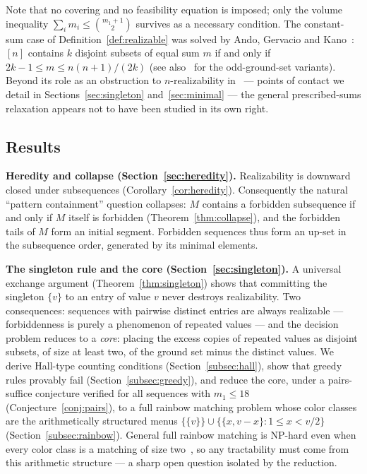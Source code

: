 \documentclass[11pt]{article}
\theoremstyle{definition}
\theoremstyle{remark}
\newcommand{\intv}[1]{[#1]}
\begin{document}
Note that no covering and no feasibility equation is imposed; only the volume
inequality $\sum_i m_i\le\binom{m_1+1}{2}$ survives as a necessary condition. The
constant-sum case of Definition~\ref{def:realizable} was solved by Ando, Gervacio and
Kano~\cite{AndoGervacioKano90}: $\intv{n}$ contains $k$ disjoint subsets of equal sum
$m$ if and only if $2k-1\le m\le n(n+1)/(2k)$ (see also~\cite{FuHu94,EnomotoKano95}
for the odd-ground-set variants). Beyond its role as an obstruction to
$n$-realizability in~\cite{LladoMoragas09,Moragas10,LladoMoragas12} --- points of
contact we detail in Sections~\ref{sec:singleton} and~\ref{sec:minimal} --- the
general prescribed-sums relaxation appears not to have been studied in its own
right.

\subsection{Results}

\textbf{Heredity and collapse (Section~\ref{sec:heredity}).}
Realizability is downward closed under subsequences
(Corollary~\ref{cor:heredity}). Consequently the natural ``pattern containment''
question collapses: $M$ contains a forbidden subsequence if and only if $M$ itself is
forbidden (Theorem~\ref{thm:collapse}), and the forbidden tails of $M$ form an initial
segment. Forbidden sequences thus form an up-set in the subsequence order, generated
by its minimal elements.

\textbf{The singleton rule and the core (Section~\ref{sec:singleton}).}
A universal exchange argument (Theorem~\ref{thm:singleton}) shows that committing the
singleton $\{v\}$ to an entry of value $v$ never destroys realizability. Two
consequences: sequences with pairwise distinct entries are always realizable ---
forbiddenness is purely a phenomenon of repeated values --- and the decision problem
reduces to a \emph{core}: placing the excess copies of repeated values as disjoint
subsets, of size at least two, of the ground set minus the distinct values. We derive
Hall-type counting conditions (Section~\ref{subsec:hall}), show that greedy rules
provably fail (Section~\ref{subsec:greedy}), and reduce the core, under a
pairs-suffice conjecture verified for all sequences with $m_1\le18$
(Conjecture~\ref{conj:pairs}), to a full rainbow matching problem whose color classes
are the arithmetically structured menus
$\{\{v\}\}\cup\{\{x,v-x\}:1\le x<v/2\}$ (Section~\ref{subsec:rainbow}). General full
rainbow matching is NP-hard even when every color class is a matching of size
two~\cite{ItaiRodehTanimoto78,LePfender14,HommelsheimJM26}, so any tractability must
come from this arithmetic structure --- a sharp open question isolated by the
reduction.
\end{document}
